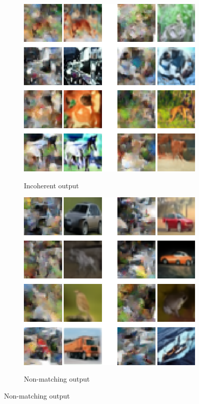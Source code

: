 \documentclass{article}
\theoremstyle{plain}
\theoremstyle{definition}
\theoremstyle{remark}
\begin{document}
\begin{figure}
    \centering
    \captionsetup{belowskip=5pt}

    \begin{subfigure}{0.42\textwidth}
        \caption{Incoherent output}
        \includegraphics[width=\linewidth]{cifar10_zeros_samps_attention_incoherent.png}
        \label{fig:cifar10-att-incoherent}
    \end{subfigure}%
    \hspace{10mm}%
    \begin{subfigure}{0.42\textwidth}
        \caption{Non-matching output}
        \includegraphics[width=\linewidth]{cifar10_zeros_samps_attention_nomatch.png}
        \label{fig:cifar10-att-nomatch}
    \end{subfigure}


\end{figure}
\end{document}
